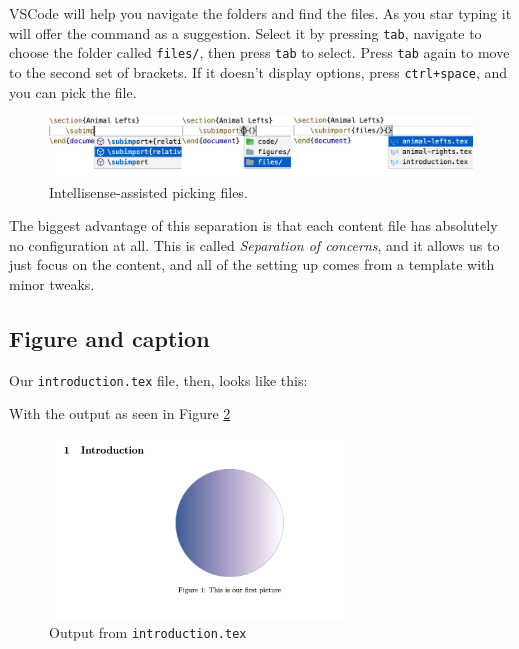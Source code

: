 VSCode will help you navigate the folders and find the files.
As you star typing \verb|| it will offer the command as a suggestion.
Select it by pressing \verb|tab|, navigate to choose the folder called \verb|files/|, then press \verb|tab| to select.
Press \verb|tab| again to move to the second set of brackets. If it doesn't display options, press \verb|ctrl+space|, and you can pick the file.
\begin{figure}[h]
    \centering
    \includegraphics[width=\textwidth]{figures/subimport.png}
    \caption{Intellisense-assisted picking files.}
    \label{fig:animal-lefts}
\end{figure}

The biggest advantage of this separation is that each content file has absolutely no configuration at all.
This is called \emph{Separation of concerns}, and it allows us to just focus on the content, and all of the setting up comes from a template with minor tweaks.

\subsection{Figure and caption}
Our \verb|introduction.tex| file, then, looks like this:


With the output as seen in Figure \ref{fig:figures}

\begin{figure}[h]
    \centering
        \includegraphics[width=0.7\textwidth]{figures/figures.png}
    \caption{Output from \texttt{introduction.tex}}
    \label{fig:figures}
\end{figure}


